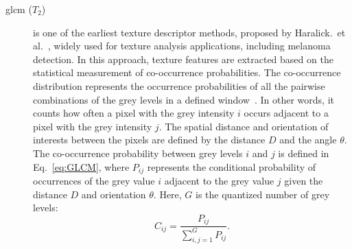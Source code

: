 \begin{description}
\item[\acf{glcm} ($T_{2}$)] is one of the earliest texture descriptor methods, proposed by Haralick.~et al.~\cite{haralick1973textural}, widely used for texture analysis applications, including melanoma detection.
In this approach, texture features are extracted based on the statistical measurement of co-occurrence probabilities.
The co-occurrence distribution represents the occurrence probabilities of all the pairwise combinations of the grey levels in a defined window~\cite{clausi2002analysis}.
In other words, it counts how often a pixel with the grey intensity $i$ occurs adjacent to a pixel with the grey intensity $j$.
The spatial distance and orientation of interests between the pixels are defined by the distance $D$ and the angle $\theta$.
The co-occurrence probability between grey levels $i$ and $j$ is defined in Eq.~\ref{eq:GLCM}, where $P_{ij}$ represents the conditional probability of occurrences of the grey value $i$ adjacent to the grey value $j$ given the distance $D$ and orientation $\theta$.
Here, $G$ is the quantized number of grey levels:
\begin{equation}
    C_{ij} = \frac{P_{ij}}{\sum_{i,j=1}^{G} P_{ij}}.   
\label{eq:GLCM}
\end{equation}


\end{description}
